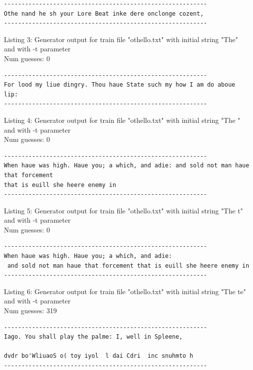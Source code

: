 \documentclass{article}
\begin{document}
\begin{lstlisting}
----------------------------------------------------------
Othe nand he sh your Lore Beat inke dere onclonge cozent,
----------------------------------------------------------
\end{lstlisting}

Listing 3: Generator output for train file "othello.txt" with initial string "The" and with -t parameter
\\Num guesses: 0

\begin{lstlisting}
----------------------------------------------------------
For lood my liue dingry. Thou haue State such my how I am do aboue lip:
----------------------------------------------------------
\end{lstlisting}

Listing 4: Generator output for train file "othello.txt" with initial string "The " and with -t parameter
\\Num guesses: 0

\begin{lstlisting}
----------------------------------------------------------
When haue was high. Haue you; a which, and adie: and sold not man haue that forcement 
that is euill she heere enemy in
----------------------------------------------------------
\end{lstlisting}

Listing 5: Generator output for train file "othello.txt" with initial string "The t" and with -t parameter
\\Num guesses: 0

\begin{lstlisting}
----------------------------------------------------------
When haue was high. Haue you; a which, and adie:
 and sold not man haue that forcement that is euill she heere enemy in
----------------------------------------------------------
\end{lstlisting}

Listing 6: Generator output for train file "othello.txt" with initial string "The te" and with -t parameter
\\Num guesses: 319

\begin{lstlisting}
----------------------------------------------------------
Iago. You shall play the palme: I, well in Spleene,

dvdr bo'WliuaoS o( toy iyol  l dai Cdri  inc snuhmto h 
----------------------------------------------------------
\end{lstlisting}
\end{document}
